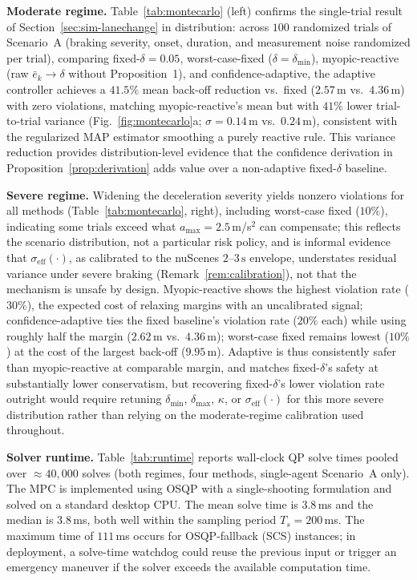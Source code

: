 \documentclass[letterpaper, 10 pt, conference]{ieeeconf}
\begin{document}
\textbf{Moderate regime.}
Table~\ref{tab:montecarlo} (left) confirms the single-trial result of
Section~\ref{sec:sim-lanechange} in distribution: across $100$ randomized
trials of Scenario~A (braking severity, onset, duration, and measurement noise
randomized per trial), comparing fixed-$\delta=0.05$, worst-case-fixed
($\delta=\delta_{\min}$), myopic-reactive (raw $\bar e_k\!\to\!\delta$ without
Proposition~1), and confidence-adaptive, the adaptive controller achieves a
$41.5\%$ mean back-off reduction vs.\ fixed ($2.57$\,m vs.\ $4.36$\,m) with
zero violations, matching myopic-reactive's mean but with $41\%$ lower
trial-to-trial variance (Fig.~\ref{fig:montecarlo}a; $\sigma=0.14$\,m vs.\
$0.24$\,m), consistent with the regularized MAP estimator smoothing a purely
reactive rule. This variance reduction provides distribution-level evidence that the confidence derivation in Proposition~\ref{prop:derivation} adds value over a non-adaptive fixed-$\delta$ baseline.

\textbf{Severe regime.}
Widening the deceleration severity yields nonzero violations
for all methods (Table~\ref{tab:montecarlo}, right), including worst-case
fixed ($10\%$), indicating some trials exceed what $a_{\max}=2.5$\,m/s$^2$
can compensate; this reflects the scenario distribution, not a particular
risk policy, and is informal evidence that $\sigma_{\mathrm{eff}}(\cdot)$, as
calibrated to the nuScenes $2$--$3\,\mathrm{s}$ envelope, understates residual variance under severe
braking (Remark~\ref{rem:calibration}), not that the mechanism is unsafe by design.
Myopic-reactive shows the highest violation rate ($30\%$), the expected cost of
relaxing margins with an uncalibrated signal; confidence-adaptive ties the
fixed baseline's violation rate ($20\%$ each) while using roughly half the
margin ($2.62$\,m vs.\ $4.36$\,m); worst-case fixed remains lowest ($10\%$) at
the cost of the largest back-off ($9.95$\,m). Adaptive is thus consistently
safer than myopic-reactive at comparable margin, and matches fixed-$\delta$'s
safety at substantially lower conservatism, but recovering fixed-$\delta$'s
lower violation rate outright would require retuning $\delta_{\min}$,
$\delta_{\max}$, $\kappa$, or $\sigma_{\mathrm{eff}}(\cdot)$ for this more
severe distribution rather than relying on the moderate-regime calibration
used throughout.

\textbf{Solver runtime.}
Table~\ref{tab:runtime} reports wall-clock QP solve times pooled over ${\approx}40{,}000$ solves (both regimes, four methods, single-agent Scenario~A only). The MPC is implemented using OSQP with a single-shooting formulation and solved on a standard desktop CPU. The mean solve time is $3.8$\,ms and the median is $3.8$\,ms, both well within the sampling period $T_s=200$\,ms. The maximum time of $111$\,ms occurs for OSQP-fallback (SCS) instances; in deployment, a solve-time watchdog could reuse the previous input or trigger an emergency maneuver if the solver exceeds the available computation time.
\end{document}
